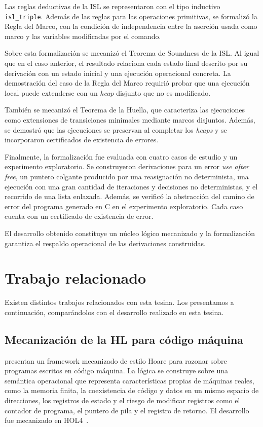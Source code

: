 \documentclass[a4paper,	11pt]{report}
\newif\ifdraft\drafttrue
\newcommand{\comm}[3]{\ifdraft{{\color{#1}[#2: #3]}}\fi}
\newcommand{\guido}[1]{\comm{blue}{Guido}{#1}}
\begin{document}
Las reglas deductivas de la ISL se representaron con el tipo inductivo \lstinline|isl_triple|.
Además de las reglas para las operaciones primitivas,
se formalizó la Regla del Marco,
con la condición de independencia entre la aserción usada como marco y las variables modificadas por el comando.

Sobre esta formalización se mecanizó el Teorema de Soundness de la ISL.
Al igual que en el caso anterior,
el resultado relaciona cada estado final descrito por su derivación con un estado inicial y una ejecución operacional concreta.
La demostración del caso de la Regla del Marco requirió probar que una ejecución local puede extenderse con un \emph{heap} disjunto que no es modificado.

También se mecanizó el Teorema de la Huella,
que caracteriza las ejecuciones como extensiones de transiciones minimales mediante marcos disjuntos.
Además,
se demostró que las ejecuciones se preservan al completar los \emph{heaps} y se incorporaron certificados de existencia de errores.

Finalmente,
la formalización fue evaluada con cuatro casos de estudio y un experimento exploratorio.
Se construyeron derivaciones para un error \emph{use after free},
un puntero colgante producido por una reasignación no determinista,
una ejecución con una gran cantidad de iteraciones y decisiones no deterministas,
y el recorrido de una lista enlazada.
Además,
se verificó la abstracción del camino de error del programa generado en C en el experimento exploratorio.
Cada caso cuenta con un certificado de existencia de error.

El desarrollo obtenido constituye un núcleo lógico mecanizado y la formalización garantiza el respaldo operacional de las derivaciones construidas.

\section{Trabajo relacionado}
\label{sec:relacionado}
Existen distintos trabajos relacionados con esta tesina.
Los presentamos a continuación,
comparándolos con el desarrollo realizado en esta tesina.

\subsection*{Mecanización de la HL para código máquina}
\citet{mchoare} presentan un framework mecanizado de estilo Hoare para razonar sobre programas escritos en código máquina.
La lógica se construye sobre una semántica operacional que representa características propias de máquinas reales,
como la memoria finita,
la coexistencia de código y datos en un mismo espacio de direcciones,
los registros de estado y el riesgo de modificar registros como el contador de programa,
el puntero de pila y el registro de retorno.
El desarrollo fue mecanizado en HOL4~\citep{hol4}.
\end{document}
